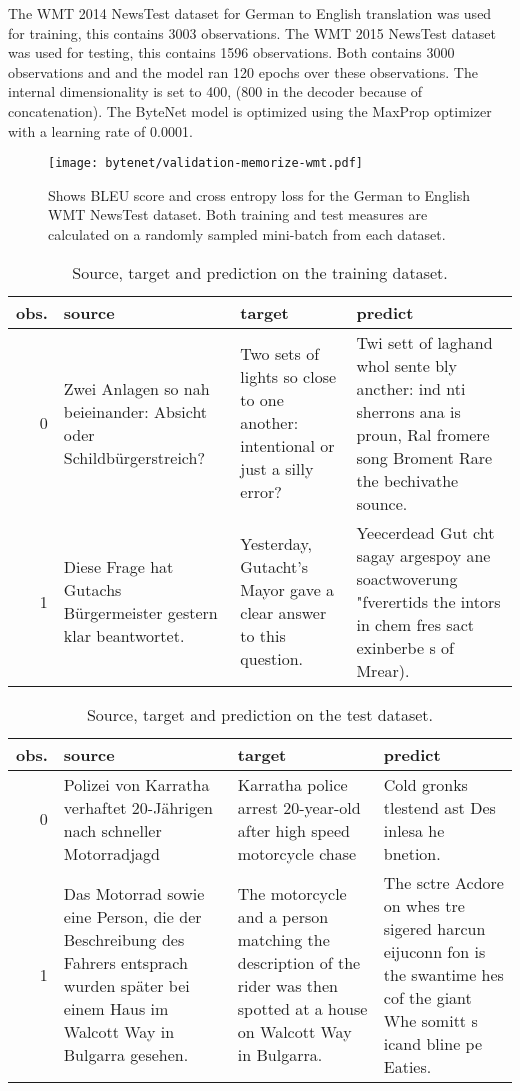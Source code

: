 The WMT 2014 NewsTest dataset for German to English translation was used for training, this contains 3003 observations. The WMT 2015 NewsTest dataset was used for testing, this contains 1596 observations. Both contains 3000 observations and and the model ran 120 epochs over these observations. The internal dimensionality is set to 400, (800 in the decoder because of concatenation). The ByteNet model is optimized using the MaxProp optimizer with a learning rate of 0.0001.

\begin{figure}[h]
    \centering
    \texttt{[image: bytenet/validation-memorize-wmt.pdf]}
    \caption{Shows BLEU score and cross entropy loss for the German to English WMT NewsTest dataset. Both training and test measures are calculated on a randomly sampled mini-batch from each dataset.}
\end{figure}

\begin{table}[h]
\centering
\begin{tabular}{r|p{3.3cm} p{3.3cm} p{3.3cm}}
	obs. & source & target & predict\\ \hline
  0  & Zwei Anlagen so nah beieinander: Absicht oder Schildbürgerstreich? & Two sets of lights so close to one another: intentional or just a silly error? & Twi sett of laghand whol sente bly ancther: ind nti sherrons ana is proun, Ral fromere song Broment Rare the bechivathe sounce. \\
  1 & Diese Frage hat Gutachs Bürgermeister gestern klar beantwortet. & Yesterday, Gutacht's Mayor gave a clear answer to this question. & Yeecerdead Gut cht sagay argespoy ane soactwoverung "fverertids the intors in chem fres sact exinberbe s of Mrear).
\end{tabular}
\caption{Source, target and prediction on the training dataset.}
\end{table}

\begin{table}[h]
\centering
\begin{tabular}{r|p{3.3cm} p{3.3cm} p{3.3cm}}
	obs. & source & target & predict\\ \hline
  0  & Polizei von Karratha verhaftet 20-Jährigen nach schneller Motorradjagd & Karratha police arrest 20-year-old after high speed motorcycle chase & Cold gronks tlestend ast Des inlesa he bnetion. \\
  1  & Das Motorrad sowie eine Person, die der Beschreibung des Fahrers entsprach wurden später bei einem Haus im Walcott Way in Bulgarra gesehen. & The motorcycle and a person matching the description of the rider was then spotted at a house on Walcott Way in Bulgarra. & The sctre Acdore on whes tre sigered harcun eijuconn fon is the swantime hes cof the giant Whe somitt s icand bline pe Eaties.
\end{tabular}
\caption{Source, target and prediction on the test dataset.}
\end{table}

